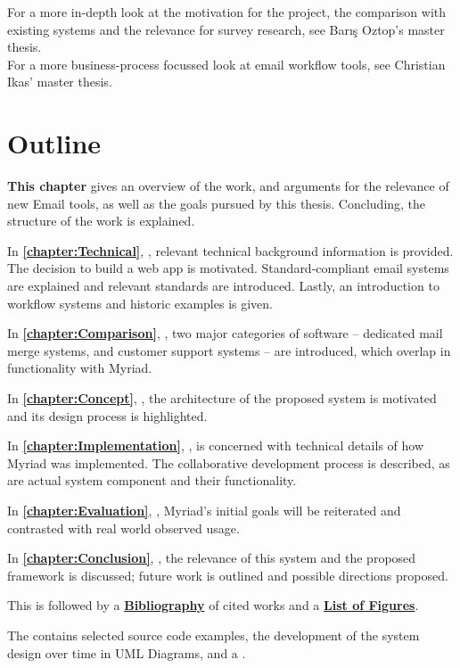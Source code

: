 For a more in-depth look at the motivation for the project, the comparison with existing systems and the relevance for survey research, see Barış Oztop's master thesis.\\
For a more business-process focussed look at email workflow tools, see Christian Ikas' master thesis.

\section{Outline}

\textbf{This chapter} gives an overview of the work, and arguments for the relevance of new Email tools, as well as the goals pursued by this thesis. Concluding, the structure of the work is explained.

In \textbf{\autoref{chapter:Technical}}, \textbf{}, relevant technical background information is provided. The decision to build a web app is motivated. Standard-compliant email systems are explained and relevant standards are introduced. Lastly, an introduction to workflow systems and historic examples is given.

In \textbf{\autoref{chapter:Comparison}}, \textbf{},  two major categories of software -- dedicated mail merge systems, and customer support systems -- are introduced, which overlap in functionality with Myriad.

In \textbf{\autoref{chapter:Concept}}, \textbf{}, the architecture of the proposed system is motivated and its design process is highlighted.

In \textbf{\autoref{chapter:Implementation}}, \textbf{}, is concerned with technical details of how Myriad was implemented. The collaborative development process is described, as are actual system component and their functionality.

In \textbf{\autoref{chapter:Evaluation}}, \textbf{}, Myriad's initial goals will be reiterated and contrasted with real world observed usage.

In \textbf{\autoref{chapter:Conclusion}}, \textbf{},  the relevance of this system and the proposed framework is discussed; future work is outlined and possible directions proposed.

This is followed by a \textbf{\hyperref[chapter:Bibliography]{Bibliography}} of cited works and a \textbf{\hyperref[chapter:Figures]{List of Figures}}.

The \textbf{} contains selected source code examples, the development of the system design over time in UML Diagrams, and a \textbf{}.

